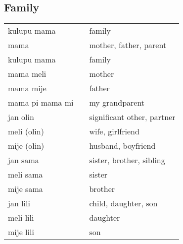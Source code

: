 \subsection{Family}
%
\begin{supertabular}{p{4,5cm}|ll}
kulupu mama && family \\
mama && mother, father, parent \\
kulupu mama && family \\
mama meli && mother \\
mama mije && father \\
mama pi mama mi && my grandparent \\
jan olin && significant other, partner \\
meli (olin) && wife, girlfriend \\
mije (olin) && husband, boyfriend \\
jan sama && sister, brother, sibling \\ 
meli sama && sister \\ 
mije sama && brother \\
jan lili && child, daughter, son \\ 
meli lili && daughter \\
mije lili && son \\
\end{supertabular} \\
%
%
